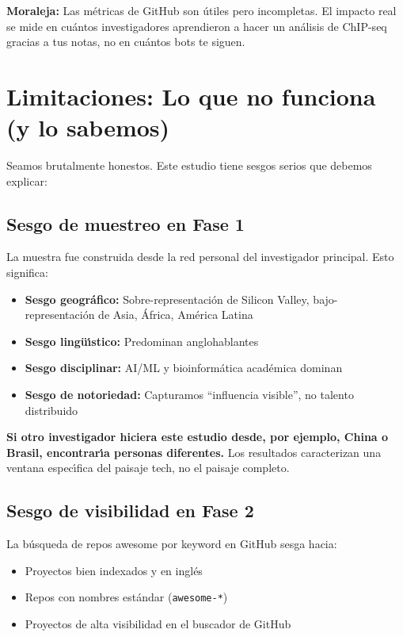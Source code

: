 \documentclass[11pt]{article}
\begin{document}
\textbf{Moraleja:} Las m\'{e}tricas de GitHub son \'{u}tiles pero incompletas. El impacto real se mide en cuántos investigadores aprendieron a hacer un análisis de ChIP-seq gracias a tus notas, no en cuántos bots te siguen.


\section{Limitaciones: Lo que no funciona (y lo sabemos)}

Seamos brutalmente honestos. Este estudio tiene sesgos serios que debemos explicar:

\subsection{Sesgo de muestreo en Fase 1}

La muestra fue construida desde la red personal del investigador principal. Esto significa:

\begin{itemize}
    \item \textbf{Sesgo geogr\'{a}fico:} Sobre-representaci\'{o}n de Silicon Valley, bajo-representaci\'{o}n de Asia, \'{A}frica, Am\'{e}rica Latina
    \item \textbf{Sesgo ling\"{u}\'{\i}stico:} Predominan anglohablantes
    \item \textbf{Sesgo disciplinar:} AI/ML y bioinform\'{a}tica acad\'{e}mica dominan
    \item \textbf{Sesgo de notoriedad:} Capturamos ``influencia visible'', no talento distribuido
\end{itemize}

\textcolor{deepred}{\textbf{Si otro investigador hiciera este estudio desde, por ejemplo, China o Brasil, encontrar\'{\i}a personas diferentes.}} Los resultados caracterizan una ventana espec\'{\i}fica del paisaje tech, no el paisaje completo.

\subsection{Sesgo de visibilidad en Fase 2}

La b\'{u}squeda de repos awesome por keyword en GitHub sesga hacia:
\begin{itemize}
    \item Proyectos bien indexados y en ingl\'{e}s
    \item Repos con nombres est\'{a}ndar (\texttt{awesome-*})
    \item Proyectos de alta visibilidad en el buscador de GitHub
\end{itemize}
\end{document}
